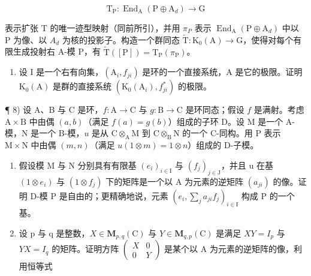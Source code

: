 \[
\mathrm{T} _ {\mathrm{P}}: \operatorname{End} _ {\mathrm{A}} (\mathrm{P} \oplus \mathrm{A} _ {d}) \longrightarrow \mathrm{G}
\]

表示扩张 T 的唯一迹型映射（同前所引），并用 \(\pi_{P}\) 表示 \(\operatorname{End}_{\mathrm{A}}(\mathrm{P} \oplus \mathrm{A}_{d})\) 中以 P 为像、以 \(A_{d}\) 为核的投影子。构造一个群同态 \(\widetilde{\mathrm{T}} : \mathrm{K}_{0}(\mathrm{A}) \to \mathrm{G}\)，使得对每个有限生成投射右 A-模 P，有 \(\widetilde{\mathrm{T}}([\mathrm{P}]) = \mathrm{T}_{\mathrm{P}}(\pi_{\mathrm{P}})\)。

\begin{enumerate}
\def\labelenumi{\arabic{enumi})}
\setcounter{enumi}{6}
\tightlist
\item
  设 I 是一个右有向集，\((\mathrm{A}_{i}, f_{ji})\) 是环的一个直接系统，A 是它的极限。证明 \(\mathrm{K}_{0}(\mathrm{A})\) 是群的直接系统 \((\mathrm{K}_{0}(\mathrm{A}_{i}), f_{ji}^{*})\) 的极限。
\end{enumerate}

¶ 8) 设 A、B 与 C 是环，\(f: \mathrm{A} \to \mathrm{C}\) 与 \(g: \mathrm{B} \to \mathrm{C}\) 是环同态；假设 \(f\) 是满射。考虑 \(\mathrm{A} \times \mathrm{B}\) 中由偶 \((a, b)\)（满足 \(f(a) = g(b)\)）组成的子环 D。设 M 是一个 A-模，N 是一个 B-模，\(u\) 是从 \(\mathrm{C} \otimes_{\mathrm{A}} \mathrm{M}\) 到 \(\mathrm{C} \otimes_{\mathrm{B}} \mathrm{N}\) 的一个 C-同构。用 P 表示 \(\mathrm{M} \times \mathrm{N}\) 中由偶 \((m, n)\)（满足 \(u(1 \otimes m) = 1 \otimes n\)）组成的 D-子模。

\begin{enumerate}
\def\labelenumi{\alph{enumi})}
\item
  假设模 M 与 N 分别具有有限基 \((e_{i})_{i\in\mathrm{I}}\) 与 \((f_{j})_{j\in\mathrm{J}}\)，并且 u 在基 \((1\otimes e_{i})\) 与 \((1\otimes f_{j})\) 下的矩阵是一个以 A 为元素的逆矩阵 \((a_{ji})\) 的像。证明 D-模 P 是自由的；更精确地说，元素 \((e_{i},\sum_{j}a_{ji}f_{j})_{i\in\mathrm{I}}\) 构成 P 的一个基。
\item
  设 p 与 q 是整数，\(X \in \mathbf{M}_{p,q}(\mathrm{C})\) 与 \(Y \in \mathbf{M}_{q,p}(\mathrm{C})\) 是满足 \(XY = I_{p}\) 与 \(YX = I_{q}\) 的矩阵。证明方阵 \(\begin{pmatrix} X & 0 \\ 0 & Y \end{pmatrix}\) 是某个以 A 为元素的逆矩阵的像，利用恒等式
\end{enumerate}

